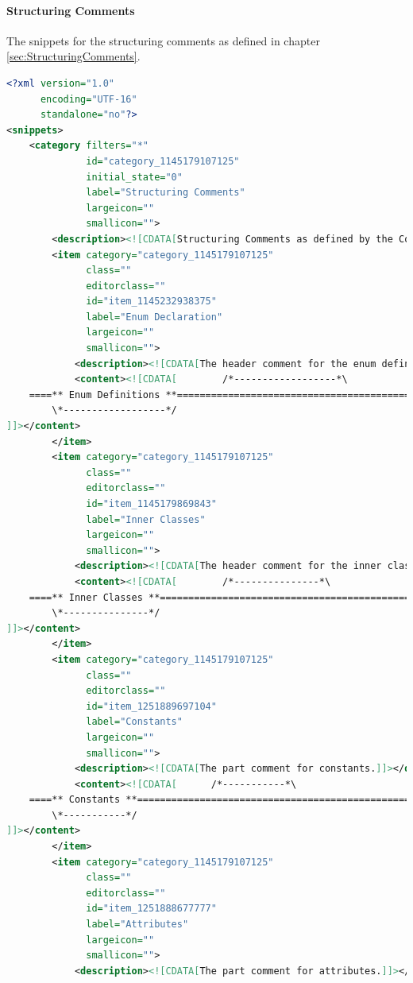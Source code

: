 \documentclass[12pt,a4paper,titlepage, parskip=half, headsepline, footsepline, cleardoubleplain]{scrbook}
\begin{document}
\paragraph{Structuring Comments}\label{sec:SnippetStructuringComments}
The snippets for the structuring comments as defined in chapter \vref{sec:StructuringComments}.
\begin{lstlisting}[language=XML,basicstyle=\ttfamily\footnotesize]
<?xml version="1.0"
      encoding="UTF-16" 
      standalone="no"?>
<snippets>
    <category filters="*"
              id="category_1145179107125"
              initial_state="0"
              label="Structuring Comments"
              largeicon=""
              smallicon="">
        <description><![CDATA[Structuring Comments as defined by the Code Conventions]]></description>
        <item category="category_1145179107125"
              class=""
              editorclass=""
              id="item_1145232938375"
              label="Enum Declaration"
              largeicon=""
              smallicon="">
            <description><![CDATA[The header comment for the enum definition part]]></description>
            <content><![CDATA[        /*------------------*\
    ====** Enum Definitions **=================================================
        \*------------------*/
]]></content>
        </item>
        <item category="category_1145179107125"
              class=""
              editorclass=""
              id="item_1145179869843"
              label="Inner Classes"
              largeicon=""
              smallicon="">
            <description><![CDATA[The header comment for the inner classes part]]></description>
            <content><![CDATA[        /*---------------*\
    ====** Inner Classes **====================================================
        \*---------------*/
]]></content>
        </item>
        <item category="category_1145179107125"
              class=""
              editorclass=""
              id="item_1251889697104"
              label="Constants"
              largeicon=""
              smallicon="">
            <description><![CDATA[The part comment for constants.]]></description>
            <content><![CDATA[      /*-----------*\
    ====** Constants **========================================================
        \*-----------*/
]]></content>
        </item>
        <item category="category_1145179107125"
              class=""
              editorclass=""
              id="item_1251888677777"
              label="Attributes"
              largeicon=""
              smallicon="">
            <description><![CDATA[The part comment for attributes.]]></description>

\end{lstlisting}
\end{document}
